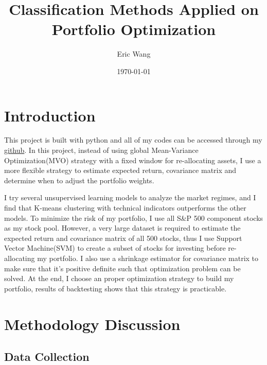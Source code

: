 \documentclass[a4paper,12pt]{article}
\title{Classification Methods Applied on Portfolio Optimization}
\author{Eric Wang}
\date{\today}
\begin{document}
\maketitle

\section{Introduction}

This project is built with python and all of my codes can be accessed through my \href{https://github.com/ywang408/ml_portfolio_optimization}{github}. In this project, instead of using global Mean-Variance Optimization(MVO) strategy with a fixed window for re-allocating assets, I use a more flexible strategy to estimate expected return, covariance matrix and determine when to adjust the portfolio weights.

I try several unsupervised learning models to analyze the market regimes, and I find that K-means clustering with technical indicators outperforms the other models. To minimize the risk of my portfolio, I use all S\&P 500 component stocks as my stock pool. However, a very large dataset is required to estimate the expected return and covariance matrix of all 500 stocks, thus I use Support Vector Machine(SVM) to create a subset of stocks for investing before re-allocating my portfolio. I also use a shrinkage estimator for covariance matrix to make sure that it's positive definite such that optimization problem can be solved. At the end, I choose an proper optimization strategy to build my portfolio, results of backtesting shows that this strategy is practicable.


\section{Methodology Discussion}\label{Methodology}

\subsection{Data Collection}
  
\end{document}
